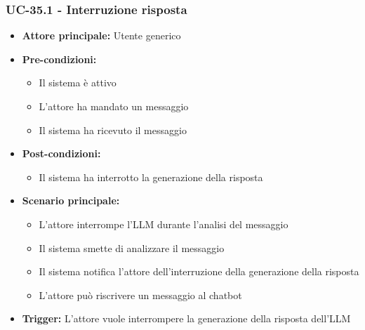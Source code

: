 \documentclass[a4paper,12pt]{article}
\begin{document}
\subsubsection{UC-35.1 - Interruzione risposta} \label{sec:UC-35.1}
\begin{itemize}
    \item \textbf{Attore principale:} Utente generico
    \item \textbf{Pre-condizioni:} 
    \begin{itemize}
        \item Il sistema è attivo
	    \item L'attore ha mandato un messaggio
	    \item Il sistema ha ricevuto il messaggio
    \end{itemize}	
    \item \textbf{Post-condizioni:}
    \begin{itemize}
        \item Il sistema ha interrotto la generazione della risposta
    \end{itemize}
    \item \textbf{Scenario principale:} 
    \begin{itemize}
        \item L'attore interrompe l'LLM durante l'analisi del messaggio
        \item Il sistema smette di analizzare il messaggio
        \item Il sistema notifica l'attore dell'interruzione della generazione della risposta
        \item L'attore può riscrivere un messaggio al chatbot
    \end{itemize}
    \item \textbf{Trigger:} L'attore vuole interrompere la generazione della risposta dell'LLM
\end{itemize}
\end{document}
